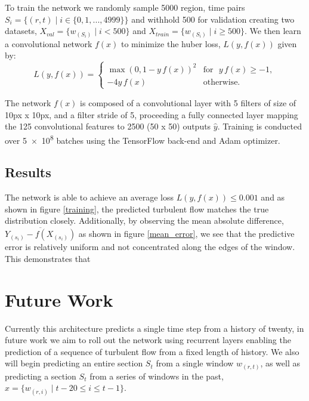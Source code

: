 To train the network we randomly sample 5000 region, time pairs $S_i = \{(r, t) \mid i \in \{0, 1, ..., 4999\} \}$ and withhold 500 for validation creating two datasets, $X_{val} = \{w_{(S_i)} \mid i < 500 \} $ and $X_{train} = \{ {w_{(S_i)}\mid i \geq 500} \}$. We then learn a convolutional network $f(x)$ to minimize the huber loss, $L(y, f(x))$ given by:
$$L(y, f(x)) = \begin{cases}
	\max(0, 1 - y \, f(x))^2 & \textrm{for }\, \,  y \, f(x) \ge -1, \\
	-4y \, f(x)              & \textrm{otherwise.}
\end{cases}$$

The network $f(x)$ is composed of a convolutional layer with 5 filters of size of 10px x 10px, and a filter stride of 5, proceeding a fully connected layer mapping the 125 convolutional features to 2500 (50 x 50) outputs $\hat{y}$. Training is conducted over \num{5e+8} batches using the TensorFlow back-end and Adam optimizer.


\subsection{Results}
 The network is able to achieve an average loss $L(y, f(x)) \leq 0.001$ and as shown in figure \ref{training}, the predicted turbulent flow matches the true distribution closely. Additionally, by observing the mean absolute difference, $\overline{Y_{(s_i)} - f(X_{(s_i)})}$ as shown in figure \ref{mean_error}, we see that the predictive error is relatively uniform and not concentrated along the edges of the window. This demonstrates that 





\section{Future Work}
Currently this architecture predicts a single time step from a history of twenty, in future work we aim to roll out the network using recurrent layers enabling the prediction of a sequence of turbulent flow from a fixed length of history. We also will begin predicting an entire section $S_t$ from a single window $w_(r,t)$, as well as predicting a section $S_t$ from a series of windows in the past, $x = \{w_{(r,i)} \mid t-20 \leq i \leq t-1 \}$. 

